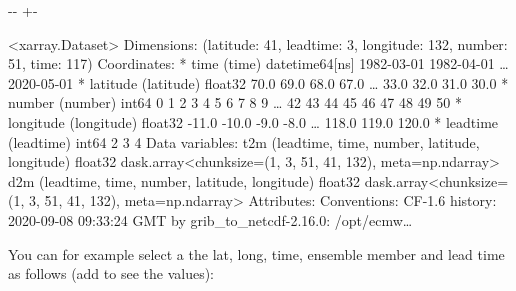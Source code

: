 \documentclass[letterpaper,10pt,english]{sphinxmanual}
\newlength\nbsphinxcodecellspacing
\begin{document}
{

\kern-\sphinxverbatimsmallskipamount\kern-\baselineskip
\kern+\FrameHeightAdjust\kern-\fboxrule
\vspace{\nbsphinxcodecellspacing}

\begin{sphinxVerbatim}[commandchars=\\\{\}]
\llap{\color{nbsphinxout}[8]:\,\hspace{\fboxrule}\hspace{\fboxsep}}<xarray.Dataset>
Dimensions:    (latitude: 41, leadtime: 3, longitude: 132, number: 51, time: 117)
Coordinates:
  * time       (time) datetime64[ns] 1982-03-01 1982-04-01 {\ldots} 2020-05-01
  * latitude   (latitude) float32 70.0 69.0 68.0 67.0 {\ldots} 33.0 32.0 31.0 30.0
  * number     (number) int64 0 1 2 3 4 5 6 7 8 9 {\ldots} 42 43 44 45 46 47 48 49 50
  * longitude  (longitude) float32 -11.0 -10.0 -9.0 -8.0 {\ldots} 118.0 119.0 120.0
  * leadtime   (leadtime) int64 2 3 4
Data variables:
    t2m        (leadtime, time, number, latitude, longitude) float32 dask.array<chunksize=(1, 3, 51, 41, 132), meta=np.ndarray>
    d2m        (leadtime, time, number, latitude, longitude) float32 dask.array<chunksize=(1, 3, 51, 41, 132), meta=np.ndarray>
Attributes:
    Conventions:  CF-1.6
    history:      2020-09-08 09:33:24 GMT by grib\_to\_netcdf-2.16.0: /opt/ecmw{\ldots}
\end{sphinxVerbatim}
}

You can for example select a the lat, long, time, ensemble member and lead time as follows (add  to see the values):

{
\begin{sphinxVerbatim}[commandchars=\\\{\}]
\llap{\color{nbsphinxin}[ ]:\,\hspace{\fboxrule}\hspace{\fboxsep}}
\end{sphinxVerbatim}
}
\end{document}

